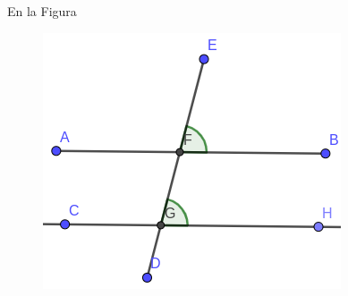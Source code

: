 \question[10] En la Figura %

\begin{figure}[H]
    \centering
    \includegraphics[width=0.5\linewidth]{../images/ang_correspond01}





    \caption{}
    \label{fig:ang_correspond01}
\end{figure}

